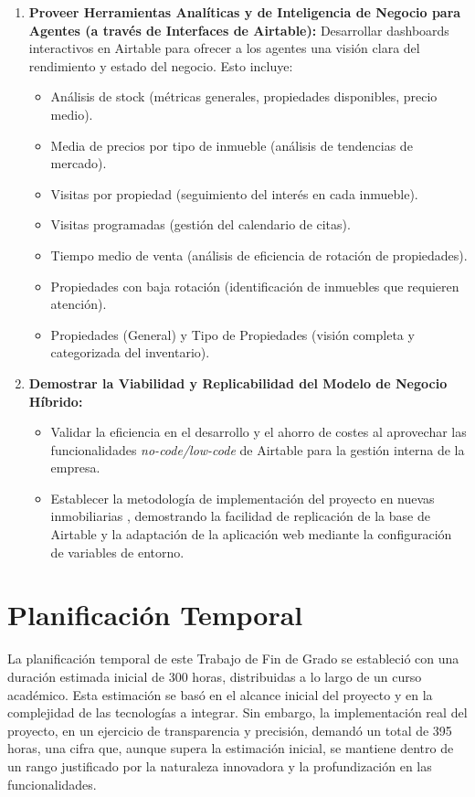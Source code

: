 \begin{enumerate}
    \item \textbf{Proveer Herramientas Analíticas y de Inteligencia de Negocio para Agentes (a través de Interfaces de Airtable):}
    Desarrollar dashboards interactivos en Airtable para ofrecer a los agentes una visión clara del rendimiento y estado del negocio. Esto incluye:
    \begin{itemize}
        \item Análisis de stock (métricas generales, propiedades disponibles, precio medio).
        \item Media de precios por tipo de inmueble (análisis de tendencias de mercado).
        \item Visitas por propiedad (seguimiento del interés en cada inmueble).
        \item Visitas programadas (gestión del calendario de citas).
        \item Tiempo medio de venta (análisis de eficiencia de rotación de propiedades).
        \item Propiedades con baja rotación (identificación de inmuebles que requieren atención).
        \item Propiedades (General) y Tipo de Propiedades (visión completa y categorizada del inventario).
    \end{itemize}

    \item \textbf{Demostrar la Viabilidad y Replicabilidad del Modelo de Negocio Híbrido:}

    \begin{itemize}
        \item Validar la eficiencia en el desarrollo y el ahorro de costes al aprovechar las funcionalidades \textit{no-code/low-code} de Airtable para la gestión interna de la empresa.
        \item Establecer la metodología de implementación del proyecto en nuevas inmobiliarias \cite{appmaster2024inmobiliarias}, demostrando la facilidad de replicación de la base de Airtable y la adaptación de la aplicación web mediante la configuración de variables de entorno.
    \end{itemize}

\end{enumerate}


\section{Planificación Temporal}


La planificación temporal de este Trabajo de Fin de Grado se estableció con una duración estimada inicial de 300 horas, distribuidas a lo largo de un curso académico. Esta estimación se basó en el alcance inicial del proyecto y en la complejidad de las tecnologías a integrar. Sin embargo, la implementación real del proyecto, en un ejercicio de transparencia y precisión, demandó un total de 395 horas, una cifra que, aunque supera la estimación inicial, se mantiene dentro de un rango justificado por la naturaleza innovadora y la profundización en las funcionalidades.

